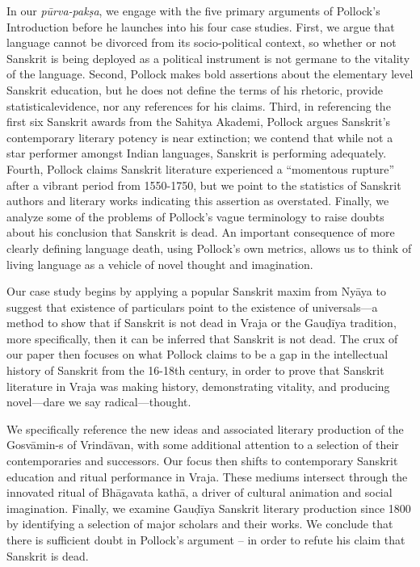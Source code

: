 In our {\sl pūrva-pakṣa}, we engage with the five primary arguments of Pollock’s Introduction before he launches into his four case studies. First, we argue that language cannot be divorced from its socio-political context, so whether or not Sanskrit is being deployed as a political instrument is not germane to the vitality of the language. Second, Pollock makes bold assertions about the elementary level Sanskrit education, but he does not define the terms of his rhetoric, provide statisticalevidence, nor any references for his claims. Third, in referencing the first six Sanskrit awards from the Sahitya Akademi, Pollock argues Sanskrit’s contemporary literary potency is near extinction; we contend that while not a star performer amongst Indian languages, Sanskrit is performing adequately. Fourth, Pollock claims Sanskrit literature experienced a “momentous rupture” after a vibrant period from 1550-1750, but we point to the statistics of Sanskrit authors and literary works indicating this assertion as overstated. Finally, we analyze some of the problems of Pollock’s vague terminology to raise doubts about his conclusion that Sanskrit is dead. An important consequence of more clearly defining language death, using Pollock’s own metrics, allows us to think of living language as a vehicle of novel thought and imagination. 
\vskip 2pt

Our case study begins by applying a popular Sanskrit maxim from Nyāya to suggest that existence of particulars point to the existence of universals—a method to show that if Sanskrit is not dead in Vraja or the Gauḍīya tradition, more specifically, then it can be inferred that Sanskrit is not dead. The crux of our paper then focuses on what Pollock claims to be a gap in the intellectual history of Sanskrit from the 16-18th century, in order to prove that Sanskrit literature in Vraja was making history, demonstrating vitality, and producing novel—dare we say radical—thought.

We specifically reference the new ideas and associated literary production of the Gosvāmin-s of Vrindāvan, with some additional attention to a selection of their contemporaries and successors. Our focus then shifts to contemporary Sanskrit education and ritual performance in Vraja. These mediums intersect through the innovated ritual of Bhāgavata kathā, a driver of cultural animation and social imagination. Finally, we examine Gauḍīya Sanskrit literary production since 1800 by identifying a selection of major scholars and their works. We conclude that there is sufficient doubt in Pollock’s argument – in order to refute his claim that Sanskrit is dead. 

